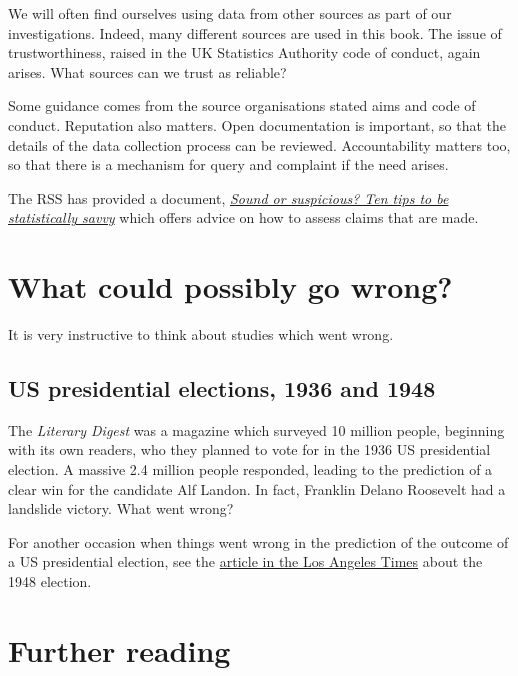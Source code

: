 \documentclass[
]{book}
\begin{document}
We will often find ourselves using data from other sources as part of our investigations. Indeed, many different sources are used in this book.
The issue of trustworthiness, raised in the UK Statistics Authority code of conduct, again arises. What sources can we trust as reliable?

Some guidance comes from the source organisations stated aims and code of conduct. Reputation also matters. Open documentation is important, so that the details of the data collection process can be reviewed. Accountability matters too, so that there is a mechanism for query and complaint if the need arises.

The RSS has provided a document, \href{https://rss.org.uk/RSS/media/File-library/Policy/2024/RSS-guide-to-statistics-on-social-media.pdf}{\emph{Sound or suspicious? Ten tips to be statistically savvy}} which offers advice on how to assess claims that are made.

\section{What could possibly go wrong?}\label{what-could-possibly-go-wrong}

It is very instructive to think about studies which went wrong.

\subsection{US presidential elections, 1936 and 1948}\label{us-presidential-elections-1936-and-1948}

The \emph{Literary Digest} was a magazine which surveyed 10 million people, beginning with its own readers, who they planned to vote for in the 1936 US presidential election. A massive 2.4 million people responded, leading to the prediction of a clear win for the candidate Alf Landon. In fact, Franklin Delano Roosevelt had a landslide victory. What went wrong?

For another occasion when things went wrong in the prediction of the outcome of a US presidential election, see the \href{https://www.latimes.com/archives/la-xpm-1998-nov-01-mn-38174-story.html}{article in the Los Angeles Times} about the 1948 election.

\section{Further reading}\label{further-reading}
\end{document}
